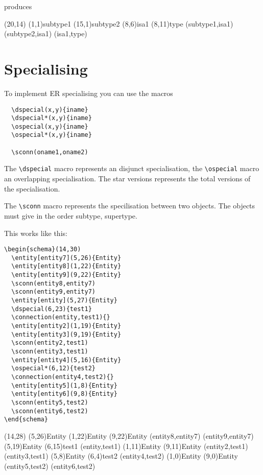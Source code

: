 \documentclass[a4paper,11pt]{article}
\begin{document}
produces

\begin{schema}(20,14)
  \entity(1,1){subtype1}
  \entity(15,1){subtype2}
  \isa(8,6){isa1}
  \entity(8,11){type}
  \conn(subtype1,isa1){}
  \conn(subtype2,isa1){}
  \conn(isa1,type){}
\end{schema}

\section{Specialising}

To implement ER specialising you can use the macros

\begin{verbatim}
  \dspecial(x,y){iname}
  \dspecial*(x,y){iname}
  \ospecial(x,y){iname}
  \ospecial*(x,y){iname}
 
  \sconn(oname1,oname2)
\end{verbatim}

The \verb|\dspecial| macro represents an disjunct specialisation, the 
\verb|\ospecial| macro an overlapping specialisation. The star versions 
represents the total versions of the specialisation.

The \verb|\sconn| macro represents the specilisation between two objects. 
The objects must give in the order subtype, supertype.

This works like this:

\begin{verbatim}
\begin{schema}(14,30)
  \entity[entity7](5,26){Entity}
  \entity[entity8](1,22){Entity}
  \entity[entity9](9,22){Entity}
  \sconn(entity8,entity7)
  \sconn(entity9,entity7)
  \entity[entity](5,27){Entity}
  \dspecial(6,23){test1}
  \connection(entity,test1){}
  \entity[entity2](1,19){Entity}
  \entity[entity3](9,19){Entity}
  \sconn(entity2,test1)
  \sconn(entity3,test1)
  \entity[entity4](5,16){Entity}
  \ospecial*(6,12){test2}
  \connection(entity4,test2){}
  \entity[entity5](1,8){Entity}
  \entity[entity6](9,8){Entity}
  \sconn(entity5,test2)
  \sconn(entity6,test2)
\end{schema}
\end{verbatim}

\begin{schema}(14,28)
  \entity[entity7](5,26){Entity}
  \entity[entity8](1,22){Entity}
  \entity[entity9](9,22){Entity}
  \sconn(entity8,entity7)
  \sconn(entity9,entity7)
  \entity[entity](5,19){Entity}
  \dspecial(6,15){test1}
  \connection(entity,test1){}
  \entity[entity2](1,11){Entity}
  \entity[entity3](9,11){Entity}
  \sconn(entity2,test1)
  \sconn(entity3,test1)
  \entity[entity4](5,8){Entity}
  \ospecial*(6,4){test2}
  \connection(entity4,test2){}
  \entity[entity5](1,0){Entity}
  \entity[entity6](9,0){Entity}
  \sconn(entity5,test2)
  \sconn(entity6,test2)
\end{schema}
\end{document}
